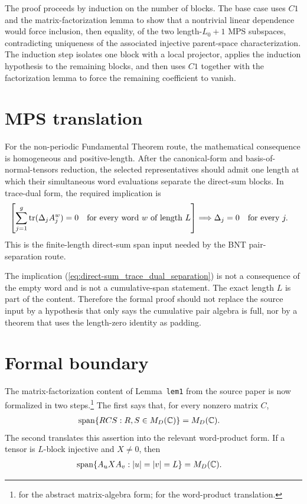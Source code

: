 \documentclass{article}
\begin{document}
The proof proceeds by induction on the number of blocks. The base case uses
$C1$ and the matrix-factorization lemma to show that a nontrivial linear
dependence would force inclusion, then equality, of the two length-$L_0+1$ MPS
subspaces, contradicting uniqueness of the associated injective parent-space
characterization. The induction step isolates one block with a local
projector, applies the induction hypothesis to the remaining blocks, and then
uses $C1$ together with the factorization lemma to force the remaining
coefficient to vanish.

\section{MPS translation}

For the non-periodic Fundamental Theorem route, the mathematical consequence is
homogeneous and positive-length. After the canonical-form and
basis-of-normal-tensors reduction, the selected representatives should admit
one length at which their simultaneous word evaluations separate the
direct-sum blocks. In trace-dual form, the required implication is
\begin{align}
    \left[\sum_{j=1}^g\operatorname{tr}(\Delta_jA_j^w)=0
        \quad\text{for every word }w\text{ of length }L\right]
     & \Longrightarrow
    \Delta_j=0
    \quad\text{for every }j.
    \label{eq:direct-sum_trace_dual_separation}
\end{align}
This is the finite-length direct-sum span input needed by the BNT
pair-separation route.

The implication
(\ref{eq:direct-sum_trace_dual_separation}) is not a consequence of the empty
word and is not a cumulative-span statement. The exact length $L$ is part of
the content. Therefore the formal proof should not replace the source input by
a hypothesis that only says the cumulative pair algebra is full, nor by a
theorem that uses the length-zero identity as padding.

\section{Formal boundary}

The matrix-factorization content of Lemma~\texttt{lem1} from the source paper
is now formalized in two steps.\footnote{%
     for the abstract
    matrix-algebra form;
    for the word-product translation.}
The first says that, for every nonzero matrix $C$,
\begin{align}
    \operatorname{span}
    \{RCS:R,S\in M_D(\mathbb{C})\}
     & =M_D(\mathbb{C}).
    \label{eq:direct-sum_nonzero_matrix_product_span}
\end{align}
The second translates this assertion into the relevant word-product form. If a
tensor is $L$-block injective and $X\ne 0$, then
\begin{align}
    \operatorname{span}
    \{A_uXA_v:|u|=|v|=L\}
     & =M_D(\mathbb{C}).
    \label{eq:direct-sum_word_product_factorization_span}
\end{align}
\end{document}
